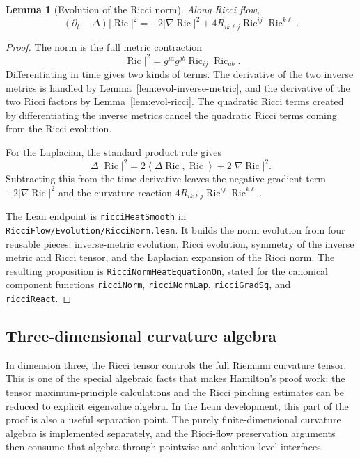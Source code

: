 \documentclass[11pt]{article}
\theoremstyle{plain}
\newtheorem{lemma}[theorem]{Lemma}
\theoremstyle{definition}
\theoremstyle{remark}
\newcommand{\Ric}{\operatorname{Ric}}
\newcommand{\ip}[2]{\left\langle #1,#2\right\rangle}
\newcommand{\norm}[1]{\left|#1\right|}
\newcommand{\leanref}[1]{\nolinkurl{#1}}
\newcommand{\leanfile}[1]{\nolinkurl{#1}}
\newcommand{\rffile}[1]{\leanfile{#1}}
\begin{document}
\begin{lemma}[Evolution of the Ricci norm]
\label{lem:evol-ricci-norm}
Along Ricci flow,
\[
(\partial_t-\Delta)\norm{\Ric}^2
=
-2\norm{\nabla\Ric}^2
+4R_{ik\ell j}\Ric^{ij}\Ric^{k\ell}.
\]
\end{lemma}

\begin{proof}
The norm is the full metric contraction
\[
  \norm{\Ric}^2
  =
  g^{ia}g^{jb}\Ric_{ij}\Ric_{ab}.
\]
Differentiating in time gives two kinds of terms.  The derivative of the two
inverse metrics is handled by Lemma~\ref{lem:evol-inverse-metric}, and the
derivative of the two Ricci factors by Lemma~\ref{lem:evol-ricci}.  The
quadratic Ricci terms created by differentiating the inverse metrics cancel the
quadratic Ricci terms coming from the Ricci evolution.

For the Laplacian, the standard product rule gives
\[
  \Delta\norm{\Ric}^2
  =
  2\ip{\Delta\Ric}{\Ric}
  +
  2\norm{\nabla\Ric}^2.
\]
Subtracting this from the time derivative leaves the negative gradient term
\(-2\norm{\nabla\Ric}^2\) and the curvature reaction
\(4R_{ik\ell j}\Ric^{ij}\Ric^{k\ell}\).

The Lean endpoint is \leanref{ricciHeatSmooth} in
\rffile{RicciFlow/Evolution/RicciNorm.lean}.  It builds the norm evolution from
four reusable pieces: inverse-metric evolution, Ricci evolution, symmetry of the
inverse metric and Ricci tensor, and the Laplacian expansion of the Ricci norm.
The resulting proposition is \leanref{RicciNormHeatEquationOn}, stated
for the canonical component functions \leanref{ricciNorm}, \leanref{ricciNormLap},
\leanref{ricciGradSq}, and \leanref{ricciReact}.
\end{proof}

\subsection{Three-dimensional curvature algebra}

In dimension three, the Ricci tensor controls the full Riemann curvature tensor.
This is one of the special algebraic facts that makes Hamilton's proof work:
the tensor maximum-principle calculations and the Ricci pinching estimates can
be reduced to explicit eigenvalue algebra.  In the Lean development, this part
of the proof is also a useful separation point.  The purely finite-dimensional
curvature algebra is implemented separately, and the Ricci-flow preservation
arguments then consume that algebra through pointwise and solution-level
interfaces.
\end{document}
